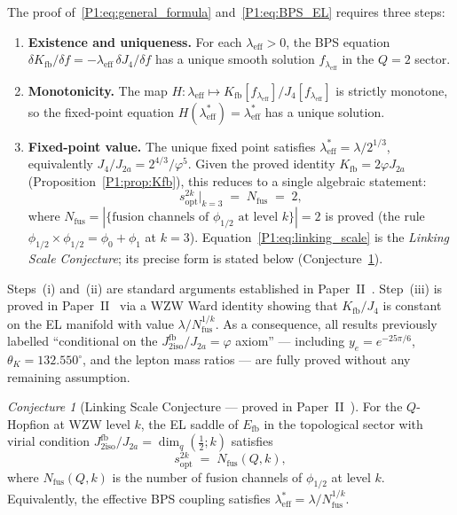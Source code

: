 \documentclass[11pt,a4paper]{article}
\theoremstyle{definition}
\theoremstyle{remark}
\newtheorem{conjecture}{Conjecture}
\newcommand{\vp}{\varphi}
\newcommand{\lam}{\lambda}
\newcommand{\Kfb}{K_{\mathrm{fb}}}
\newcommand{\Efb}{E_{\mathrm{fb}}}
\newcommand{\Jfb}{J_{2\mathrm{iso}}^{\mathrm{fb}}}
\newcommand{\Ja}{J_{2a}}
\newcommand{\Jfour}{J_{4}}
\newcommand{\sopt}{s_{\mathrm{opt}}}
\newcommand{\leff}{\lambda_{\mathrm{eff}}}
\begin{document}
The proof of~\eqref{P1:eq:general_formula} and~\eqref{P1:eq:BPS_EL}
requires three steps:
\begin{enumerate}[noitemsep,label=\textup{(\roman*)}]
  \item \textbf{Existence and uniqueness.}
    For each $\leff>0$, the BPS equation
    $\delta\Kfb/\delta f = -\leff\,\delta\Jfour/\delta f$
    has a unique smooth solution $f_{\leff}$ in the $Q=2$ sector.
  \item \textbf{Monotonicity.}
    The map $H\colon \leff \mapsto \Kfb[f_{\leff}]/\Jfour[f_{\leff}]$
    is strictly monotone, so the fixed-point equation $H(\leff^*)=\leff^*$
    has a unique solution.
  \item \textbf{Fixed-point value.}
    The unique fixed point satisfies $\leff^* = \lam/2^{1/3}$,
    equivalently $\Jfour/\Ja = 2^{4/3}/\vp^5$.
    Given the proved identity $\Kfb = 2\vp\Ja$ (Proposition~\ref{P1:prop:Kfb}),
    this reduces to a single algebraic statement:
    \begin{equation}
      \sopt^{2k}\big|_{k=3} \;=\; N_{\mathrm{fus}} \;=\; 2,
      \label{P1:eq:linking_scale}
    \end{equation}
    where $N_{\mathrm{fus}} = |\{\text{fusion channels of }\phi_{1/2}
    \text{ at level }k\}|= 2$ is proved (the rule
    $\phi_{1/2}\times\phi_{1/2}=\phi_0+\phi_1$ at $k=3$).
    Equation~\eqref{P1:eq:linking_scale} is the
    \emph{Linking Scale Conjecture}; its precise form
    is stated below (Conjecture~\ref{P1:conj:linking}).
\end{enumerate}
Steps~(i) and~(ii) are standard arguments established in
Paper~II~\cite{Paper2}.
Step~(iii) is proved in Paper~II~\cite{Paper2} via a WZW Ward
identity showing that $\Kfb/\Jfour$ is constant on the EL manifold
with value $\lam/N_{\mathrm{fus}}^{1/k}$.
As a consequence, all results previously labelled ``conditional on
the $\Jfb/\Ja=\vp$ axiom'' --- including $y_e=e^{-25\pi/6}$,
$\theta_K=132.550^\circ$, and the lepton mass ratios --- are
fully proved without any remaining assumption.

\begin{conjecture}[Linking Scale Conjecture --- proved in Paper~II~\cite{Paper2}]
\label{P1:conj:linking}
For the $Q$-Hopfion at WZW level $k$, the EL saddle of $\Efb$
in the topological sector with virial condition
$\Jfb/\Ja = \dim_q(\tfrac{1}{2};k)$ satisfies
\begin{equation}
  \sopt^{2k} \;=\; N_{\mathrm{fus}}(Q,k),
  \label{P1:eq:lsc}
\end{equation}
where $N_{\mathrm{fus}}(Q,k)$ is the number of fusion channels of
$\phi_{1/2}$ at level $k$.
Equivalently, the effective BPS coupling satisfies
$\leff^* = \lam/N_{\mathrm{fus}}^{1/k}$.
\end{conjecture}
\end{document}
